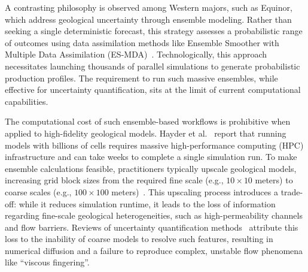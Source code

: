 A contrasting philosophy is observed among Western majors, such as Equinor, which address geological uncertainty through ensemble modeling. Rather than seeking a single deterministic forecast, this strategy assesses a probabilistic range of outcomes using data assimilation methods like Ensemble Smoother with Multiple Data Assimilation (ES-MDA)~\cite{equinor_es_mda}. Technologically, this approach necessitates launching thousands of parallel simulations to generate probabilistic production profiles. The requirement to run such massive ensembles, while effective for uncertainty quantification, sits at the limit of current computational capabilities.

The computational cost of such ensemble-based workflows is prohibitive when applied to high-fidelity geological models. Hayder et al.~\cite{stanford_hpc_simulation} report that running models with billions of cells requires massive high-performance computing (HPC) infrastructure and can take weeks to complete a single simulation run. To make ensemble calculations feasible, practitioners typically upscale geological models, increasing grid block sizes from the required fine scale (e.g., $10\times10$ meters) to coarse scales (e.g., $100\times100$ meters)~\cite{slb_delfi_ensemble}. This upscaling process introduces a trade-off: while it reduces simulation runtime, it leads to the loss of information regarding fine-scale geological heterogeneities, such as high-permeability channels and flow barriers. Reviews of uncertainty quantification methods~\cite{uq_reservoir_review} attribute this loss to the inability of coarse models to resolve such features, resulting in numerical diffusion and a failure to reproduce complex, unstable flow phenomena like \enquote{viscous fingering}.

